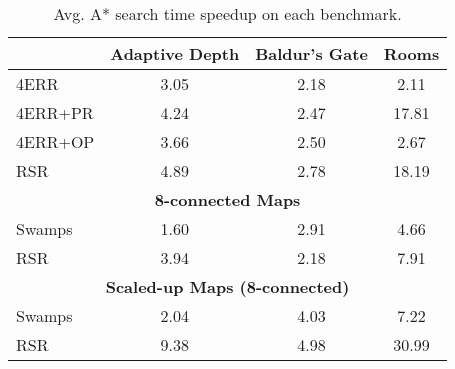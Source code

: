 \begin{table}[ht]
\begin{center}
\begin{tabular}{lccc}
  \hline
 & {\textbf{Adaptive Depth}} & {\textbf{Baldur's Gate}} & {\textbf{Rooms}} \\
  \hline
  4ERR & 3.05 & 2.18 &  2.11 \\ 
  4ERR+PR & 4.24 & 2.47 & 17.81 \\ 
  4ERR+OP & 3.66 &  2.50 & 2.67  \\ 
  RSR & 4.89 & 2.78 & 18.19  \\  
  \hline \hline
   \multicolumn{4}{c}{\textbf{8-connected Maps}} \\ 
	\hline 
  Swamps & 1.60 & 2.91 & 4.66 \\ 
  RSR & 3.94 & 2.18 & 7.91 \\ 
\hline \hline
 \multicolumn{4}{c}{\textbf{Scaled-up Maps (8-connected)}} \\ 
 \hline
  Swamps & 2.04 & 4.03 & 7.22 \\ 
  RSR & 9.38 & 4.98 & 30.99 \\ 
   \hline
\end{tabular}
\end{center}
\caption{Avg. A* search time speedup on each benchmark.} 
\label{table-results}
\end{table}

